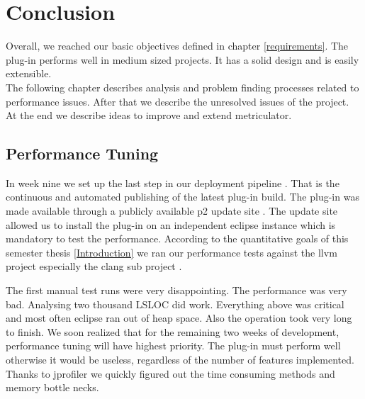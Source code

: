 \documentclass[11pt,a4paper,oneside]{scrreprt}
\begin{document}
\chapter{Conclusion}
Overall, we reached our basic objectives defined in chapter \ref{requirements}. The plug-in performs well in medium sized projects. It has a solid design and is easily extensible.\\
The following chapter describes analysis and problem finding processes related to performance issues. After that we describe the unresolved issues of the project. At the end we describe ideas to improve and extend metriculator.

\section{Performance Tuning}\label{performance-tuning}
In week nine we set up the last step in our deployment pipeline \cite{contdelivery}. That is the continuous and automated publishing of the latest plug-in build. The plug-in was made available through a publicly available p2 update site \cite{updatesite}. The update site allowed us to install the plug-in on an independent eclipse instance which is mandatory to test the performance.
According to the quantitative goals of this semester thesis \ref{Introduction} we ran our performance tests against the llvm project \cite{llvm} especially the clang sub project \cite{clang}.

The first manual test runs were very disappointing. The performance was very bad. Analysing two thousand LSLOC did work. Everything above was critical and most often eclipse ran out of heap space. Also the operation took very long to finish. We soon realized that for the remaining two weeks of development, performance tuning will have highest priority. The plug-in must perform well otherwise it would be useless, regardless of the number of features implemented.
Thanks to jprofiler \cite{jprofiler} we quickly figured out the time consuming methods and memory bottle necks.
\end{document}
